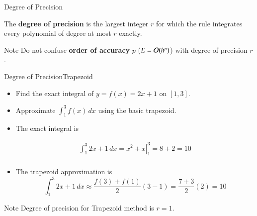 \documentclass[10pt]{beamer}
\begin{document}
\begin{frame}{Degree of Precision}

{
{
The \textbf{degree of precision} is the largest integer $r$ for which the rule integrates every polynomial of degree at most $r$ exactly.
}}

\begin{block}{Note}
    Do not confuse \textbf{order of accuracy} $p$ ($E={\mathcal{O}}(h^p)$) with degree of precision $r$.  
\end{block}





\end{frame}
\begin{frame}{Degree of Precision}{Trapezoid}

\begin{example}
    \begin{itemize}
        \item Find the exact integral of $y=f(x) = 2x+1 $ on $[1,3]$.
        \item Approximate $\int_1^3 f(x)\, dx$ using the basic trapezoid. 
    \end{itemize}
\end{example}

\begin{itemize}
    \item The exact integral is 

        \begin{align*}
            \int_1^3 2x+1\, dx = \left. x^2 + x\right|_1^3 = 8+2 = 10\\ 
        \end{align*}
    \item The trapezoid approximation is 
        $$
        \int_1^3 2x+1\, dx \approx \frac{f(3)+f(1)}{2}(3-1) = \frac{7+3}{2}(2) = 10
        $$
\end{itemize}

\begin{block}{Note}
    Degree of precision for Trapezoid method is $r=1$.
\end{block}
\end{frame}
\end{document}
